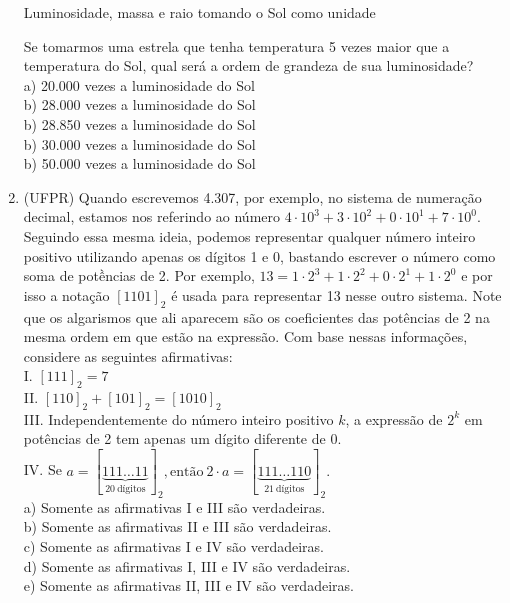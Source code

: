 \documentclass[a4paper, 11pt]{article}
\begin{document}
\begin{enumerate}
\begin{table}[h!]
\begin{tabular}{ccccc}
                \bottomrule
            \end{tabular}\label{tab:table}
        \end{table}
        \caption{Luminosidade, massa e raio tomando o Sol como unidade}
        Se tomarmos uma estrela que tenha temperatura 5 vezes maior que a temperatura do Sol, qual será a ordem de grandeza de sua luminosidade? \\
        a) 20.000 vezes a luminosidade do Sol \\
        b) 28.000 vezes a luminosidade do Sol \\
        b) 28.850 vezes a luminosidade do Sol \\
        b) 30.000 vezes a luminosidade do Sol \\
        b) 50.000 vezes a luminosidade do Sol \\[1.5ex]
        \item (UFPR) Quando escrevemos 4.307, por exemplo, no sistema de numeração decimal,
        estamos nos referindo ao número $4\cdot10^3+3\cdot10^2+0\cdot10^1+7\cdot10^0$.
        Seguindo essa mesma ideia, podemos representar qualquer número inteiro positivo
        utilizando apenas os dígitos 1 e 0, bastando escrever o número como soma de potềncias
        de 2. Por exemplo, $13=1\cdot2^3+1\cdot2^2+0\cdot2^1+1\cdot2^0$ e por isso a notação
        $[1101]_2$ é usada para representar 13 nesse outro sistema. Note que os algarismos
        que ali aparecem são os coeficientes das potências de 2 na mesma ordem em que estão
        na expressão. Com base nessas informações, considere as seguintes afirmativas: \\
        I. $[111]_2=7$ \\
        II. $[110]_2+[101]_2=[1010]_2$ \\
        III. Independentemente do número inteiro positivo $k$, a expressão de $2^k$ em potências
        de 2 tem apenas um dígito diferente de 0. \\
        IV. Se $a=[\underbrace{111\ldots11}_{20\ \text{dígitos}}]_2,\text{então}\
        2\cdot a=[\underbrace{111\ldots110}_{21\ \text{dígitos}}]_2.$ \\[1.5ex]
        a) Somente as afirmativas I e III são verdadeiras. \\
        b) Somente as afirmativas II e III são verdadeiras. \\
        c) Somente as afirmativas I e IV são verdadeiras. \\
        d) Somente as afirmativas I, III e IV são verdadeiras. \\
        e) Somente as afirmativas II, III e IV são verdadeiras. \\[1.5ex]


\end{enumerate}
\end{document}
